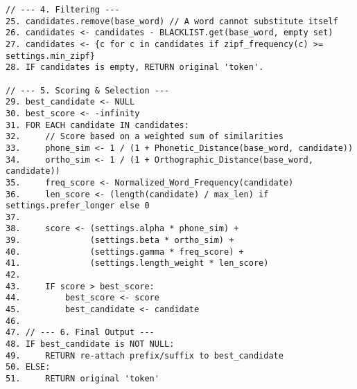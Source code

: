 \documentclass[12pt]{article}
\begin{document}
\begin{verbatim}
// --- 4. Filtering ---
25. candidates.remove(base_word) // A word cannot substitute itself
26. candidates <- candidates - BLACKLIST.get(base_word, empty set)
27. candidates <- {c for c in candidates if zipf_frequency(c) >= settings.min_zipf}
28. IF candidates is empty, RETURN original 'token'.

// --- 5. Scoring & Selection ---
29. best_candidate <- NULL
30. best_score <- -infinity
31. FOR EACH candidate IN candidates:
32.     // Score based on a weighted sum of similarities
33.     phone_sim <- 1 / (1 + Phonetic_Distance(base_word, candidate))
34.     ortho_sim <- 1 / (1 + Orthographic_Distance(base_word, candidate))
35.     freq_score <- Normalized_Word_Frequency(candidate)
36.     len_score <- (length(candidate) / max_len) if settings.prefer_longer else 0
37.
38.     score <- (settings.alpha * phone_sim) +
39.              (settings.beta * ortho_sim) +
40.              (settings.gamma * freq_score) +
41.              (settings.length_weight * len_score)
42.
43.     IF score > best_score:
44.         best_score <- score
45.         best_candidate <- candidate
46.
47. // --- 6. Final Output ---
48. IF best_candidate is NOT NULL:
49.     RETURN re-attach prefix/suffix to best_candidate
50. ELSE:
51.     RETURN original 'token'
\end{verbatim}
\end{document}
